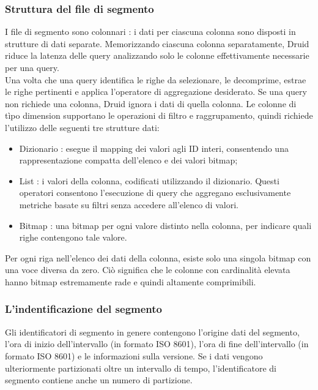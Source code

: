 \documentclass{article}
\begin{document}
\subsubsection{Struttura del file di segmento}
I file di segmento sono colonnari : i dati per ciascuna colonna sono disposti in strutture di dati separate. Memorizzando ciascuna colonna separatamente, Druid riduce la latenza delle query analizzando solo le colonne effettivamente necessarie per una query. \\
Una volta che una query identifica le righe da selezionare, le decomprime, estrae le righe pertinenti e applica l'operatore di aggregazione desiderato.  Se una query non richiede una colonna, Druid ignora i dati di quella colonna.
Le colonne di tìpo dimension supportano le operazioni di filtro e raggrupamento, quindi richiede l'utilizzo delle seguenti tre strutture dati: 
\begin{itemize}
    \item Dizionario : esegue il mapping dei valori agli ID interi, consentendo una rappresentazione compatta dell'elenco e dei valori bitmap;
    \item List : i valori della colonna, codificati utilizzando il dizionario.
    Questi operatori consentono l'esecuzione di query che aggregano esclusivamente metriche basate su filtri senza accedere all'elenco di valori.
    \item Bitmap : una bitmap per ogni valore distinto nella colonna, per indicare quali righe contengono tale valore.
\end{itemize}
Per ogni riga nell'elenco dei dati della colonna, esiste solo una singola bitmap con una voce diversa da zero. Ciò significa che le colonne con cardinalità elevata hanno bitmap estremamente rade e quindi altamente comprimibili. 
\subsubsection{L'indentificazione del segmento}
Gli identificatori di segmento in genere contengono l'origine dati del segmento, l'ora di inizio dell'intervallo (in formato ISO 8601), l'ora di fine dell'intervallo (in formato ISO 8601) e le informazioni sulla versione. Se i dati vengono ulteriormente partizionati oltre un intervallo di tempo, l'identificatore di segmento contiene anche un numero di partizione.
\end{document}
